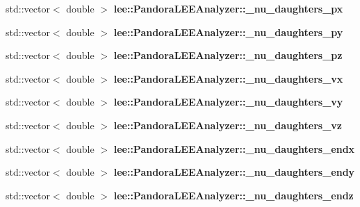 \begin{DoxyCompactItemize}
\item 
\hypertarget{group__lee_gaa834071311edb5ffa50db6132496fb95}{std\-::vector$<$ double $>$ {\bfseries lee\-::\-Pandora\-L\-E\-E\-Analyzer\-::\-\_\-nu\-\_\-daughters\-\_\-px}}\label{group__lee_gaa834071311edb5ffa50db6132496fb95}

\item 
\hypertarget{group__lee_ga3e2b79305694205bc16527e7d086058a}{std\-::vector$<$ double $>$ {\bfseries lee\-::\-Pandora\-L\-E\-E\-Analyzer\-::\-\_\-nu\-\_\-daughters\-\_\-py}}\label{group__lee_ga3e2b79305694205bc16527e7d086058a}

\item 
\hypertarget{group__lee_ga838abd41f7c806c0242d1d612e1a3c80}{std\-::vector$<$ double $>$ {\bfseries lee\-::\-Pandora\-L\-E\-E\-Analyzer\-::\-\_\-nu\-\_\-daughters\-\_\-pz}}\label{group__lee_ga838abd41f7c806c0242d1d612e1a3c80}

\item 
\hypertarget{group__lee_ga35e3d0f602ee460d83440447698baef1}{std\-::vector$<$ double $>$ {\bfseries lee\-::\-Pandora\-L\-E\-E\-Analyzer\-::\-\_\-nu\-\_\-daughters\-\_\-vx}}\label{group__lee_ga35e3d0f602ee460d83440447698baef1}

\item 
\hypertarget{group__lee_gaa564f473e072ce7fc9702781805907bd}{std\-::vector$<$ double $>$ {\bfseries lee\-::\-Pandora\-L\-E\-E\-Analyzer\-::\-\_\-nu\-\_\-daughters\-\_\-vy}}\label{group__lee_gaa564f473e072ce7fc9702781805907bd}

\item 
\hypertarget{group__lee_gadda9ce5e644a8f78ef769f443990ab20}{std\-::vector$<$ double $>$ {\bfseries lee\-::\-Pandora\-L\-E\-E\-Analyzer\-::\-\_\-nu\-\_\-daughters\-\_\-vz}}\label{group__lee_gadda9ce5e644a8f78ef769f443990ab20}

\item 
\hypertarget{group__lee_ga2c05930087430260a4ba4f26beb8355b}{std\-::vector$<$ double $>$ {\bfseries lee\-::\-Pandora\-L\-E\-E\-Analyzer\-::\-\_\-nu\-\_\-daughters\-\_\-endx}}\label{group__lee_ga2c05930087430260a4ba4f26beb8355b}

\item 
\hypertarget{group__lee_gafdefa43fde43f949f6b6af3e908cb1e2}{std\-::vector$<$ double $>$ {\bfseries lee\-::\-Pandora\-L\-E\-E\-Analyzer\-::\-\_\-nu\-\_\-daughters\-\_\-endy}}\label{group__lee_gafdefa43fde43f949f6b6af3e908cb1e2}

\item 
\hypertarget{group__lee_ga0c2eb616df5aa07c601d0bc72399c636}{std\-::vector$<$ double $>$ {\bfseries lee\-::\-Pandora\-L\-E\-E\-Analyzer\-::\-\_\-nu\-\_\-daughters\-\_\-endz}}\label{group__lee_ga0c2eb616df5aa07c601d0bc72399c636}


\end{DoxyCompactItemize}
